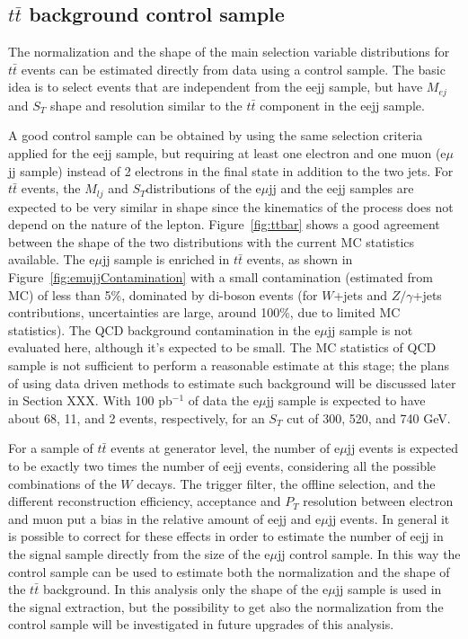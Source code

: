 \subsection{$t\bar{t}$ background control sample}

The normalization and the shape of the main selection variable distributions for 
$t\bar{t}$ events can be estimated directly from data using a control sample. 
The basic idea is to select events that are independent from the eejj sample, but have $M_{ej}$ and $S_{T}$ shape and resolution 
similar to the $t\bar{t}$ component in the eejj sample.

A good control sample can be obtained by using the same selection criteria applied for the eejj sample, but 
requiring at least one electron and one muon (e$\mu$jj sample) instead of 2 electrons 
in the final state in addition to the two jets. 
For $t\bar{t}$ events, the $M_{lj}$ and $S_{T}$distributions of the e$\mu$jj and the eejj samples
are expected to be very similar in shape since the kinematics of the process does not depend 
on the nature of the lepton. Figure~\ref{fig:ttbar} shows a good agreement between 
the shape of the two distributions with the current MC statistics available. 
The e$\mu$jj sample is enriched in $t\bar{t}$ events, as shown in Figure~\ref{fig:emujjContamination} 
with a small contamination (estimated from MC) of less than 5\%, dominated by di-boson events 
(for $W$+jets and $Z/\gamma$+jets contributions, uncertainties are large, around 100\%, due to limited MC statistics). 
The QCD background contamination in the e$\mu$jj sample is not evaluated here, although it's expected to be small. 
The MC statistics of QCD sample is not sufficient to perform a reasonable estimate at this stage;
the plans of using data driven methods to estimate such background will be discussed later in Section XXX. 
With 100 pb$^{-1}$ of data the e$\mu$jj sample is expected to have about 68, 11, and 2 events, 
respectively, for an $S_{T}$ cut of 300, 520, and 740 GeV.


For a sample of $t\bar{t}$ events at generator level, the number of e$\mu$jj events is expected to be exactly two times the number of 
eejj events, considering all the possible combinations of the $W$ decays. The trigger filter, the offline selection, 
and the different reconstruction efficiency, acceptance and $P_{T}$ resolution between electron and muon
put a bias in the relative amount of eejj and e$\mu$jj events.
In general it is possible to correct for these effects in order to estimate the number of eejj in the signal sample directly from 
the size of the e$\mu$jj control sample. In this way the control sample can be used to estimate both the normalization and the shape
of the $t\bar{t}$ background. In this analysis only the shape of the e$\mu$jj sample is used in the signal extraction, but
the possibility to get also the normalization from the control sample will be investigated in future upgrades of this analysis.


